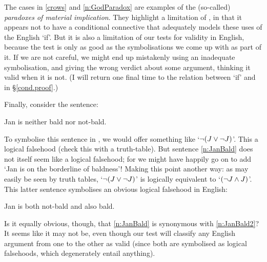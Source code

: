The cases in \ref{crows} and \ref{n:GodParadox} are examples of the (so-called) \emph{paradoxes of material implication}. They highlight a limitation of \TFL, in that it appears not to have a conditional connective that adequately models these uses of the English `if'. But it is also a limitation of our tests for validity in English, because the test is only as good as the symbolisations we come up with as part of it. If we are not careful, we might end up mistakenly using an inadequate symbolisation, and giving the wrong verdict about some argument, thinking it valid when it is not.  (I will return one final time to the relation between `if' and {\eif} in §\ref{cond.proof}.)


Finally, consider the sentence:
	\begin{earg}
		\item[\ex{n:JanBald}] Jan is neither bald nor not-bald.
	\end{earg}
To symbolise this sentence in \TFL, we would offer something like `$\neg (J \vee \neg J)$'. This a logical falsehood (check this with a truth-table). But sentence \ref{n:JanBald} does not itself seem like a logical falsehood; for we might have happily go on to add `Jan is on the borderline of baldness'! Making this point another way: as may easily be seen by truth tables, `$\neg (J \vee \neg J)$' is logically equivalent to `$(\neg J \wedge J)$'. This latter sentence symbolises an obvious logical falsehood in English:
	\begin{earg}
		\item[\ex{n:JanBald2}]  Jan is both not-bald and also bald.
	\end{earg}
Is it equally obvious, though, that \ref{n:JanBald} is synonymous with \ref{n:JanBald2}? It seems like it may not be, even though our test will classify any English argument from one to the other as valid (since both are symbolised as logical falsehoods, which degenerately entail anything). 

